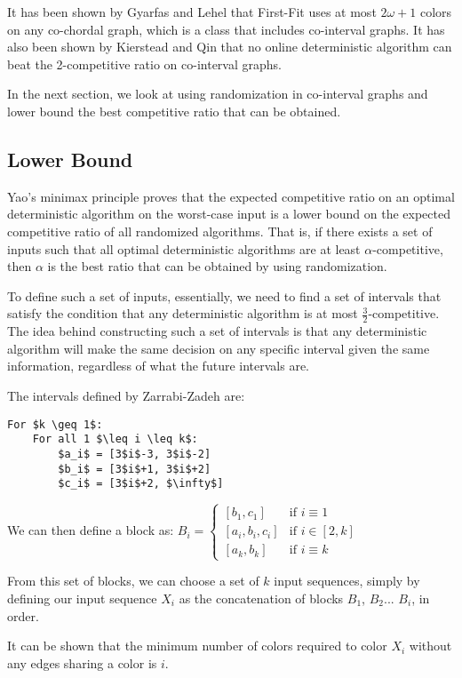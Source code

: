 It has been shown by Gyarfas and Lehel \cite{gyarfas} that First-Fit uses at most $2\omega+1$ colors on any co-chordal graph, which is a class that includes co-interval graphs. It has also been shown by Kierstead and Qin \cite{kierstead} that no online deterministic algorithm can beat the 2-competitive ratio on co-interval graphs.

In the next section, we look at using randomization in co-interval graphs and lower bound the best competitive ratio that can be obtained.
\subsection{Lower Bound}
Yao's minimax principle proves that the expected competitive ratio on an optimal deterministic algorithm on the worst-case input is a lower bound on the expected competitive ratio of all randomized algorithms. That is, if there exists a set of inputs such that all optimal deterministic algorithms are at least $\alpha$-competitive, then $\alpha$ is the best ratio that can be obtained by using randomization.

To define such a set of inputs, essentially, we need to find a set of intervals that satisfy the condition that any deterministic algorithm is at most $\frac{3}{2}$-competitive. The idea behind constructing such a set of intervals is that any deterministic algorithm will make the same decision on any specific interval given the same information, regardless of what the future intervals are.

The intervals defined by Zarrabi-Zadeh are: 
\begin{Verbatim}[commandchars=\\\{\},codes={\catcode`$=3\catcode`_=8}]
For $k \geq 1$:
    For all 1 $\leq i \leq k$:
        $a_i$ = [3$i$-3, 3$i$-2]
        $b_i$ = [3$i$+1, 3$i$+2]
        $c_i$ = [3$i$+2, $\infty$]
\end{Verbatim}
We can then define a block as:
$B_i = \begin{cases} [b_1, c_1] &\mbox{if } i \equiv 1 \\
[a_i, b_i, c_i] & \mbox{if } i \in [2,k] \\
 [a_k, b_k] &\mbox{if } i \equiv k \end{cases}$ 

From this set of blocks, we can choose a set of $k$ input sequences, simply by defining our input sequence $X_i$ as the concatenation of blocks $B_1$, $B_2$... $B_i$, in order.

It can be shown that the minimum number of colors required to color $X_i$ without any edges sharing a color is $i$.

